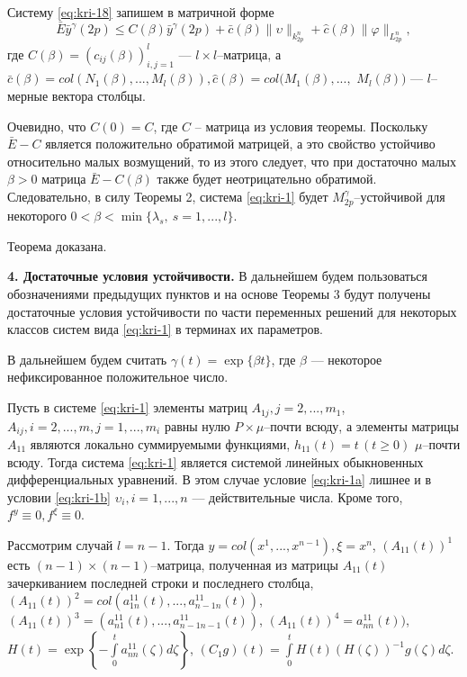 Систему \eqref{eq:kri-18} запишем в матричной форме
$$
\bar E\bar y^\gamma(2p) \leq  C(\beta )\bar y^\gamma(2p)+ \bar
c(\beta ) \|\upsilon\|_{k^n_{2p}} + \hat c(\beta )\|\varphi
\|_{L_{2p}^n},
$$
где $C(\beta) =(c_{ij}(\beta))_{i,j=1}^l$
--- $l\times l$--матрица, а $\bar c(\beta) = col (N_1(\beta ), ..., M_l(\beta )),
\hat c(\beta ) = col (M_1(\beta ), ..., $ $M_l(\beta ))$ ---
$l$--мерные вектора столбцы.

Очевидно, что $C(0) = C$, где $C$ -- матрица из условия теоремы.
Поскольку $\bar E - C$ является  положительно обратимой матрицей, а
это свойство устойчиво относительно малых возмущений, то из этого
следует, что при достаточно малых $\beta > 0$ матрица $\bar E-
C(\beta )$ также будет неотрицательно обратимой. Следовательно, в
силу Теоремы 2, система \eqref{eq:kri-1} будет $M_{2p}^\gamma$--устойчивой для
некоторого $0< \beta < \min \{\lambda _s, \ s = 1, ...,l \}$.

Теорема доказана.
\smallskip

\textbf {\bf 4. Достаточные условия устойчивости.}  В дальнейшем
будем пользоваться обозначениями предыдущих пунктов и на основе
Теоремы 3 будут получены достаточные условия устойчивости по части
переменных решений для некоторых классов систем вида \eqref{eq:kri-1} в терминах
их параметров.

В дальнейшем будем считать $\gamma (t) = \exp \{\beta t\}$, где
$\beta$ --- некоторое  нефиксированное положительное число.

Пусть в системе \eqref{eq:kri-1} элементы матриц $A_{1j}, j = 2, ..., m_1$,
$A_{ij}, i = 2, ..., m, j = 1, ..., m_i$ равны нулю
$P\times\mu$--почти всюду, а элементы матрицы $A_{11}$ являются
локально суммируемыми функциями, $h_{11}(t) = t \, (t \geq 0)$ $\mu
$--почти всюду. Тогда система \eqref{eq:kri-1} является системой линейных
обыкновенных дифференциальных уравнений. В этом случае условие \eqref{eq:kri-1a}
лишнее и в условии \eqref{eq:kri-1b} $\upsilon_i, i = 1, ..., n$ ---
действительные числа. Кроме того, $f^y \equiv 0, f^\xi \equiv 0$.


Рассмотрим случай  $l = n-1$. Тогда $y = col(x^1,...,x^{n-1}), \xi =
x^n$, $(A_{11}(t))^1$ есть $(n-1)\times (n-1)$--матрица, полученная
из матрицы $A_{11}(t)$ зачеркиванием последней строки и последнего
столбца, $(A_{11}(t))^2 = col(a^{11}_{1n}(t),...,a^{11}_{n-1
n}(t))$, $(A_{11}(t))^3 = (a^{11}_{n1}(t),...,a^{11}_{n-1n-1}(t))$,
$(A_{11}(t))^4 = a^{11}_{nn}(t))$, $H(t) = \exp \left \{-\int
\limits _{0}^t a^{11}_{nn}(\zeta)d\zeta \right \}$, $(C_1g)(t) =
\int \limits _{0}^tH(t)(H(\zeta))^{-1}g(\zeta)d\zeta$.

